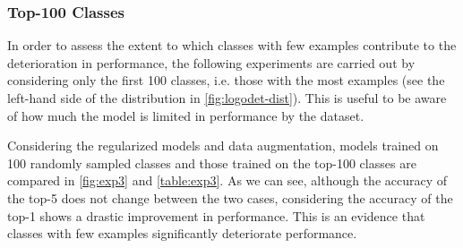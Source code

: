 \subsubsection{Top-100 Classes}
\label{sec:cil-top100}
In order to assess the extent to which classes with few examples contribute to the deterioration in performance, the following experiments are carried out by considering only the first 100 classes, i.e. those with the most examples (see the left-hand side of the distribution in \autoref{fig:logodet-dist}).
This is useful to be aware of how much the model is limited in performance by the dataset.

Considering the regularized models and data augmentation, models trained on 100 randomly sampled classes and those trained on the top-100 classes are compared in \autoref{fig:exp3} and \autoref{table:exp3}.
As we can see, although the accuracy of the top-5 does not change between the two cases, considering the accuracy of the top-1 shows a drastic improvement in performance. This is an evidence that classes with few examples significantly deteriorate performance.

